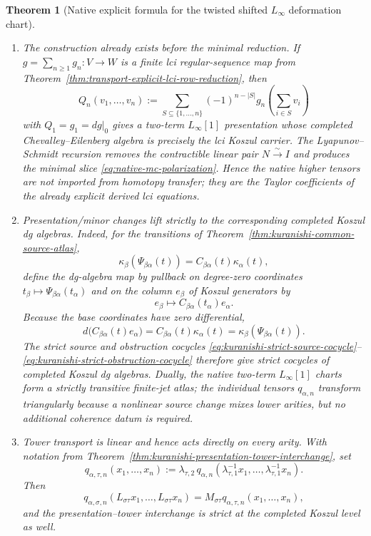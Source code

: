 \documentclass[11pt]{article}
\newtheorem{theorem}{Theorem}[section]
\theoremstyle{definition}
\begin{document}
\begin{theorem}[Native explicit formula for the twisted shifted $L_\infty$ deformation chart]
\begin{enumerate}[label=\textnormal{(\roman*)}]
\item The construction already exists before the minimal reduction.  If
$g=\sum_{n\ge1}g_n:V\to W$ is a finite lci regular-sequence map from
Theorem~\ref{thm:transport-explicit-lci-row-reduction}, then
\begin{equation}\label{eq:native-lci-polarization}
 Q_n(v_1,\ldots,v_n)
 :=\sum_{S\subseteq\{1,\ldots,n\}}
 (-1)^{n-|S|}g_n\!\left(\sum_{i\in S}v_i\right)
\end{equation}
with $Q_1=g_1=dg|_0$ gives a two-term $L_\infty[1]$ presentation whose completed
Chevalley--Eilenberg algebra is precisely the lci Koszul carrier.  The
Lyapunov--Schmidt recursion removes the contractible linear pair
$N\xrightarrow{\sim}I$ and produces the minimal slice
\eqref{eq:native-mc-polarization}.  Hence the native higher tensors are not
imported from homotopy transfer; they are the Taylor coefficients of the
already explicit derived lci equations.

\item Presentation/minor changes lift strictly to the corresponding completed
Koszul dg algebras.  Indeed, for the transitions of
Theorem~\ref{thm:kuranishi-common-source-atlas},
\[
 \kappa_\beta\!\left(\Psi_{\beta\alpha}(t)\right)
 =C_{\beta\alpha}(t)\kappa_\alpha(t),
\]
define the dg-algebra map by pullback on degree-zero coordinates
$t_\beta\mapsto\Psi_{\beta\alpha}(t_\alpha)$ and on the column $e_\beta$ of
Koszul generators by
\begin{equation}\label{eq:native-koszul-transition}
 e_\beta\longmapsto C_{\beta\alpha}(t_\alpha)e_\alpha.
\end{equation}
Because the base coordinates have zero differential,
\[
 d\bigl(C_{\beta\alpha}(t)e_\alpha\bigr)
 =C_{\beta\alpha}(t)\kappa_\alpha(t)
 =\kappa_\beta\!\left(\Psi_{\beta\alpha}(t)\right).
\]
The strict source and obstruction cocycles
\eqref{eq:kuranishi-strict-source-cocycle}--\eqref{eq:kuranishi-strict-obstruction-cocycle}
therefore give strict cocycles of completed Koszul dg algebras.  Dually, the
native two-term $L_\infty[1]$ charts form a strictly transitive finite-jet
atlas; the individual tensors $q_{\alpha,n}$ transform triangularly because a
nonlinear source change mixes lower arities, but no additional coherence datum
is required.

\item Tower transport is linear and hence acts directly on every arity.  With
notation from Theorem~\ref{thm:kuranishi-presentation-tower-interchange}, set
\[
 q_{\alpha,\tau,n}(x_1,\ldots,x_n)
 :=\lambda_{\tau,2}\,
 q_{\alpha,n}(\lambda_{\tau,1}^{-1}x_1,\ldots,
              \lambda_{\tau,1}^{-1}x_n).
\]
Then
\begin{equation}\label{eq:native-linfinity-tower-covariance}
 q_{\alpha,\sigma,n}
 (L_{\sigma\tau}x_1,\ldots,L_{\sigma\tau}x_n)
 =M_{\sigma\tau}
 q_{\alpha,\tau,n}(x_1,\ldots,x_n),
\end{equation}
and the presentation--tower interchange is strict at the completed Koszul
level as well.


\end{enumerate}
\end{theorem}
\end{document}
